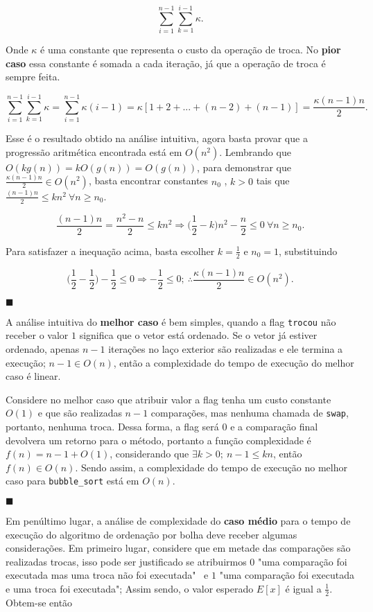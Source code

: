 \[\sum_{i=1}^{n-1}\sum_{k=1}^{i-1}\kappa.\]

Onde $\kappa$ é uma constante que representa o custo da operação de troca. No \textbf{pior caso} essa constante é somada a cada iteração, já que a operação de troca é sempre feita.

\[\sum_{i=1}^{n-1}\sum_{k=1}^{i-1}\kappa = \sum_{i=1}^{n-1}\kappa(i-1) = \kappa[1+2+...+(n-2)+(n-1)]=\frac{\kappa(n-1)n}{2}.\]

Esse é o resultado obtido na análise intuitiva, agora basta provar que a progressão aritmética encontrada está em $O(n^2)$. Lembrando que $O(kg(n)) = kO(g(n)) = O(g(n))$, para demonstrar que $\frac{\kappa(n-1)n}{2} \in O(n^2)$, basta encontrar constantes $n_0$ , $k > 0$ tais que $\frac{(n-1)n}{2}\leq kn^2 \ \forall n\geq n_0$.

\[\frac{(n-1)n}{2}=\frac{n^2 - n}{2}\leq kn^2 \Rightarrow \Bigr(\frac{1}{2}-k\Bigr)n^2 - \frac{n}{2}\leq 0 \ \forall n\geq n_0.\]

Para satisfazer a inequação acima, basta escolher $k=\frac{1}{2}$ e $n_0=1$, substituindo

\[\Bigr(\frac{1}{2}-\frac{1}{2}\Bigr) - \frac{1}{2} \leq 0 \Rightarrow-\frac{1}{2} \leq 0; \ \therefore \frac{\kappa(n-1)n}{2}\in O(n^2).\]

{\raggedleft $\blacksquare $ \par}

A análise intuitiva do \textbf{melhor caso} é bem simples, quando a flag \texttt{trocou} não receber o valor $1$ significa que o vetor está ordenado. Se o vetor já estiver ordenado, apenas $n-1$ iterações no laço exterior são realizadas e ele termina a execução; $n-1 \in O(n)$, então a complexidade do tempo de execução do melhor caso é linear.

Considere no melhor caso que atribuir valor a flag tenha um custo constante $O(1)$ e que são realizadas $n-1$ comparações, mas nenhuma chamada de \texttt{swap}, portanto, nenhuma troca. Dessa forma, a flag será $0$ e a comparação final devolvera um retorno para o método, portanto a função complexidade é $f(n) = n-1+O(1)$, considerando que $\exists k > 0; \ n-1 \leq kn$, então $f(n) \in O(n)$. Sendo assim, a complexidade do tempo de execução no melhor caso para \texttt{bubble\_sort} está em $O(n)$.

{\raggedleft $\blacksquare $ \par}

Em penúltimo lugar, a análise de complexidade do \textbf{caso médio} para o tempo de execução do algoritmo de ordenação por bolha deve receber algumas considerações. Em primeiro lugar, considere que em metade das comparações são realizadas trocas, isso pode ser justificado se atribuirmos $0$ "uma comparação foi executada mas uma troca não foi executada" \ e $1$ "uma comparação foi executada e uma troca foi executada"; Assim sendo, o valor esperado $E[x]$ é igual a $\frac{1}{2}$. Obtem-se então

